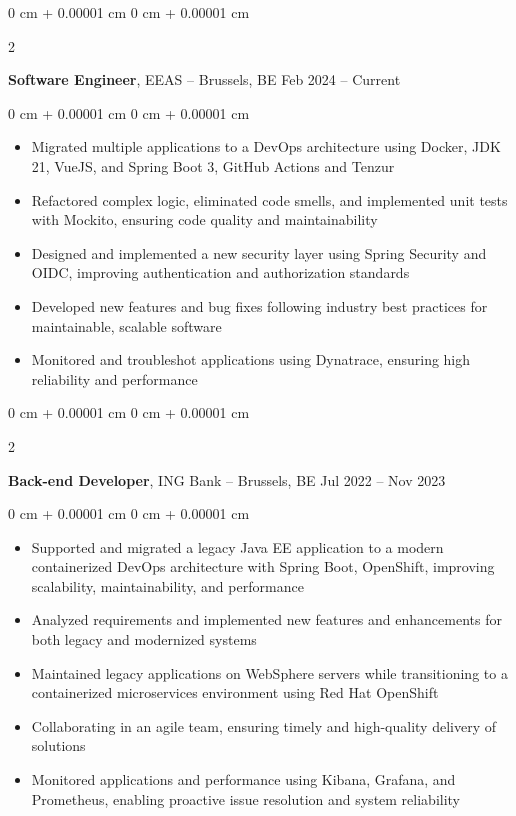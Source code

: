 \documentclass[10pt, letterpaper]{article}
\newenvironment{highlights}{
    \begin{itemize}[
        topsep=0.10 cm,
        parsep=0.10 cm,
        partopsep=0pt,
        itemsep=0pt,
        leftmargin=0 cm + 10pt
    ]
}{
    \end{itemize}
} %
\newenvironment{onecolentry}{
    \begin{adjustwidth}{
        0 cm + 0.00001 cm
    }{
        0 cm + 0.00001 cm
    }
}{
    \end{adjustwidth}
} %
\newenvironment{twocolentry}[2][]{
    \onecolentry
    \def\secondColumn{#2}
    \setcolumnwidth{\fill, 4.5 cm}
    \begin{paracol}{2}
}{
    \switchcolumn \raggedleft \secondColumn
    \end{paracol}
    \endonecolentry
} %
\begin{document}
        \begin{twocolentry}{
            Feb 2024 – Current
        }
            \textbf{Software Engineer}, EEAS -- Brussels, BE\end{twocolentry}

        \vspace{0.10 cm}
        
        \begin{onecolentry}
            \begin{highlights}
                \item Migrated multiple applications to a DevOps architecture using Docker, JDK 21, VueJS, and Spring Boot 3, GitHub Actions and Tenzur
                \item Refactored complex logic, eliminated code smells, and implemented unit tests with Mockito, ensuring code quality and maintainability
                \item Designed and implemented a new security layer using Spring Security and OIDC, improving authentication and authorization standards
                \item Developed new features and bug fixes following industry best practices for maintainable, scalable software
                \item Monitored and troubleshot applications using Dynatrace, ensuring high reliability and performance
            \end{highlights}
        \end{onecolentry}
        
        \vspace{0.2 cm}

        \begin{twocolentry}{
            Jul 2022 – Nov 2023
        }
            \textbf{Back-end Developer}, ING Bank -- Brussels, BE\end{twocolentry}

        \vspace{0.10 cm}
        
        \begin{onecolentry}
            \begin{highlights}
                \item Supported and migrated a legacy Java EE application to a modern containerized DevOps architecture with Spring Boot, OpenShift, improving scalability, maintainability, and performance
                \item Analyzed requirements and implemented new features and enhancements for both legacy and modernized systems
                \item Maintained legacy applications on WebSphere servers while transitioning to a containerized microservices environment using Red Hat OpenShift
                \item Collaborating in an agile team, ensuring timely and high-quality delivery of solutions
                \item Monitored applications and performance using Kibana, Grafana, and Prometheus, enabling proactive issue resolution and system reliability
            \end{highlights}
        \end{onecolentry}
        
\end{document}
